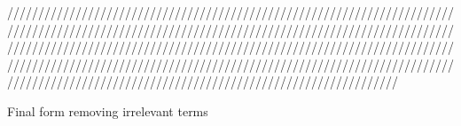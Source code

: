 \documentclass{article}
\begin{document}
\begin{Maple Normal}
///////////////////////////////////////////////////////////////////////////////////////////////////////////////////////////////////////////////////////////////////////////////////////////////////////////////////////////////////////////////////////////////////////////////////////////////////////////////////////////////////////////////////////////////
\end{Maple Normal}
\begin{Maple Normal}

\end{Maple Normal}
\begin{Maple Normal}
\textcolor[RGB]{51,153,102}{Final form removing irrelevant terms}
\end{Maple Normal}
\begin{Maple Normal}

\end{Maple Normal}
\begin{Maple Normal}

\end{Maple Normal}
\end{document}
